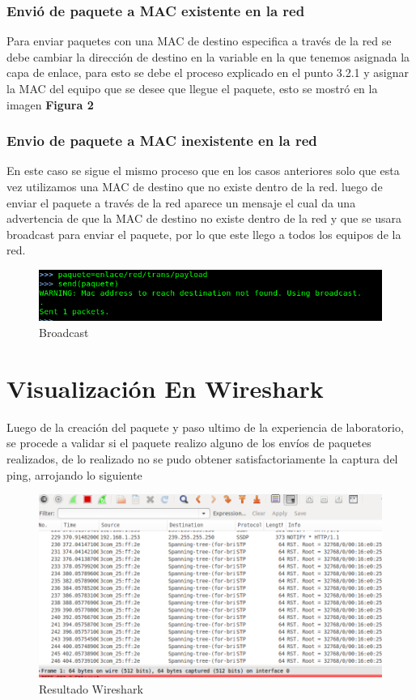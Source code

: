 \documentclass[spanish]{udpreport}
\begin{document}
\subsubsection{Envió de paquete a MAC existente en la red}
Para enviar paquetes con una MAC de destino especifica a través de la red se debe cambiar la dirección de destino en la variable en la que tenemos asignada la capa de enlace, para esto se debe el proceso explicado en el punto 3.2.1 y asignar la MAC del equipo que se desee que llegue el paquete, esto se mostró en la imagen \textbf{Figura 2}\\
\subsubsection{Envio de paquete a MAC inexistente en la red}
En este caso se sigue el mismo proceso que en los casos anteriores solo que esta vez utilizamos una MAC de destino que no existe dentro de la red. luego de enviar el paquete a través de la red aparece un mensaje el cual da una advertencia de que la MAC de destino no existe dentro de la red y que se usara broadcast para enviar el paquete, por lo que este llego a todos los equipos de la red.
\begin{figure}[h]
    \centering
    \includegraphics[scale=0.3]{images/5.png}
    \caption{Broadcast}
    \label{fig:my_label}
\end{figure}
\newpage
\section{Visualización En Wireshark}
Luego de  la creación del paquete y paso ultimo de la experiencia de laboratorio, se procede a validar si el paquete realizo alguno de los envíos de paquetes realizados, de lo realizado no se pudo obtener satisfactoriamente la captura del ping, arrojando lo siguiente
\begin{figure}[h]
    \centering
    \includegraphics[scale=0.3]{images/6.png}
    \caption{Resultado Wireshark}
    \label{fig:my_label}
\end{figure}
\end{document}
